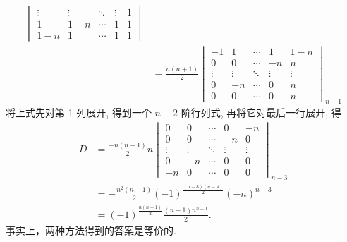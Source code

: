 \begin{exercise}
\begin{exgroup}
\begin{answer}
\begin{enumerate}
\begin{enumerate}
\begin{align*}
\begin{vmatrix}
                                        \vdots & \vdots & \ddots & \vdots & 1   \\
                                        1      & 1-n    & \cdots & 1      & 1   \\
                                        1-n    & 1      & \cdots & 1      & 1
                                    \end{vmatrix}                         \\
                                      & =\frac{n(n+1)}{2}\begin{vmatrix}
                                                             -1     & 1      & \cdots & 1      & 1-n    \\
                                                             0      & 0      & \cdots & -n     & n      \\
                                                             \vdots & \vdots & \ddots & \vdots & \vdots \\
                                                             0      & -n     & \cdots & 0      & n      \\
                                                             0      & 0      & \cdots & 0      & n
                                                         \end{vmatrix}_{n-1}
                                \end{align*}
                                将上式先对第 1 列展开, 得到一个 $n-2$ 阶行列式, 再将它对最后一行展开, 得
                                \begin{align*}
                                    D & =\frac{-n(n+1)}{2} n
                                    \begin{vmatrix}
                                        0      & 0      & \cdots & 0      & -n     \\
                                        0      & 0      & \cdots & -n     & 0      \\
                                        \vdots & \vdots & \ddots & \vdots & \vdots \\
                                        0      & -n     & \cdots & 0      & 0      \\
                                        -n     & 0      & \cdots & 0      & 0
                                    \end{vmatrix}_{n-3}                      \\
                                      & =-\frac{n^{2}(n+1)}{2}(-1)^{\frac{(n-3)(n-4)}{2}}(-n)^{n-3} \\
                                      & =(-1)^{\frac{n(n-1)}{2} }\frac{(n+1) n^{n-1}}{2}.
                                \end{align*}
                                事实上，两种方法得到的答案是等价的.
                      \end{enumerate}
            \end{enumerate}
        \end{answer}


\end{exgroup}
\end{exercise}
